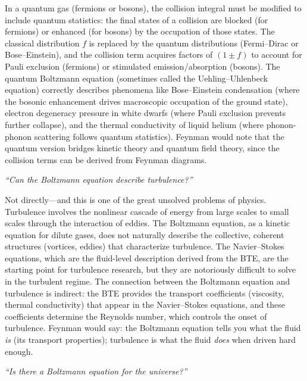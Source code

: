 \documentclass[11pt,openright]{book}
\begin{document}
In a quantum gas (fermions or bosons), the collision integral must be modified to include quantum statistics: the final states of a collision are blocked (for fermions) or enhanced (for bosons) by the occupation of those states. The classical distribution $f$ is replaced by the quantum distributions (Fermi--Dirac or Bose--Einstein), and the collision term acquires factors of $(1 \pm f)$ to account for Pauli exclusion (fermions) or stimulated emission/absorption (bosons). The quantum Boltzmann equation (sometimes called the Uehling--Uhlenbeck equation) correctly describes phenomena like Bose--Einstein condensation (where the bosonic enhancement drives macroscopic occupation of the ground state), electron degeneracy pressure in white dwarfs (where Pauli exclusion prevents further collapse), and the thermal conductivity of liquid helium (where phonon-phonon scattering follows quantum statistics). Feynman would note that the quantum version bridges kinetic theory and quantum field theory, since the collision terms can be derived from Feynman diagrams.

\textit{``Can the Boltzmann equation describe turbulence?''}

Not directly---and this is one of the great unsolved problems of physics. Turbulence involves the nonlinear cascade of energy from large scales to small scales through the interaction of eddies. The Boltzmann equation, as a kinetic equation for dilute gases, does not naturally describe the collective, coherent structures (vortices, eddies) that characterize turbulence. The Navier--Stokes equations, which are the fluid-level description derived from the BTE, are the starting point for turbulence research, but they are notoriously difficult to solve in the turbulent regime. The connection between the Boltzmann equation and turbulence is indirect: the BTE provides the transport coefficients (viscosity, thermal conductivity) that appear in the Navier--Stokes equations, and these coefficients determine the Reynolds number, which controls the onset of turbulence. Feynman would say: the Boltzmann equation tells you what the fluid \emph{is} (its transport properties); turbulence is what the fluid \emph{does} when driven hard enough.

\textit{``Is there a Boltzmann equation for the universe?''}
\end{document}
